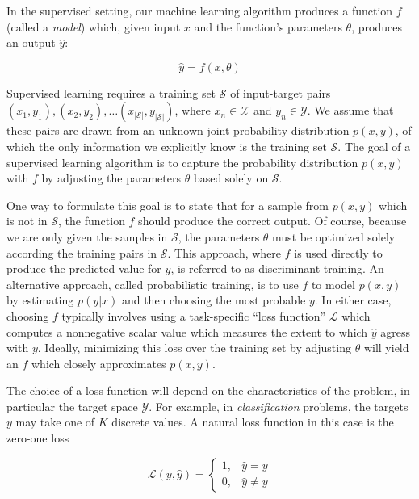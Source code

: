 In the supervised setting, our machine learning algorithm produces a function $f$ (called a {\em model}) which, given input $x$ and the function's parameters $\theta$, produces an output $\hat{y}$:

\begin{equation}
\hat{y} = f(x, \theta)
\end{equation}

Supervised learning requires a training set $\mathcal{S}$ of input-target pairs $(x_1, y_1), (x_2, y_2), \ldots (x_{|\mathcal{S}|}, y_{|\mathcal{S}|})$, where $x_n \in \mathcal{X}$ and $y_n \in \mathcal{Y}$.
We assume that these pairs are drawn from an unknown joint probability distribution $p(x, y)$, of which the only information we explicitly know is the training set $\mathcal{S}$.
The goal of a supervised learning algorithm is to capture the probability distribution $p(x, y)$ with $f$ by adjusting the parameters $\theta$ based solely on $\mathcal{S}$.

One way to formulate this goal is to state that for a sample from $p(x, y)$ which is not in $\mathcal{S}$, the function $f$ should produce the correct output.
Of course, because we are only given the samples in $\mathcal{S}$, the parameters $\theta$ must be optimized solely according the training pairs in $\mathcal{S}$.
This approach, where $f$ is used directly to produce the predicted value for $y$, is referred to as discriminant training.
An alternative approach, called probabilistic training, is to use $f$ to model $p(x, y)$ by estimating $p(y | x)$ and then choosing the most probable $y$.
In either case, choosing $f$ typically involves using a task-specific ``loss function'' $\mathcal{L}$ which computes a nonnegative scalar value which measures the extent to which $\hat{y}$ agress with $y$.
Ideally, minimizing this loss over the training set by adjusting $\theta$ will yield an $f$ which closely approximates $p(x, y)$.

The choice of a loss function will depend on the characteristics of the problem, in particular the target space $\mathcal{Y}$.
For example, in {\em classification} problems, the targets $y$ may take one of $K$ discrete values.
A natural loss function in this case is the zero-one loss

\begin{equation}
\mathcal{L}(y, \hat{y}) = \begin{cases}
1,& \hat{y} = y\\
0,& \hat{y} \ne y
\end{cases}
\end{equation}

